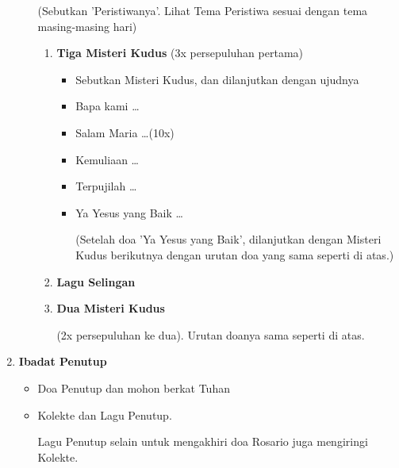 \begin{enumerate}[label=\Roman*.]
\begin{itemize}
(Sebutkan 'Peristiwanya'. Lihat Tema Peristiwa sesuai dengan tema masing-masing hari)

\begin{enumerate}[label=\alph*.]
\item  \textbf{Tiga Misteri Kudus }
(3x persepuluhan pertama)
\begin{itemize}
\item Sebutkan Misteri Kudus, dan dilanjutkan dengan ujudnya
\item Bapa kami \ldots
\item Salam Maria  \ldots(10x)
\item Kemuliaan  \ldots
\item Terpujilah  \ldots
\item Ya Yesus yang Baik  \ldots

(Setelah doa 'Ya Yesus yang Baik', dilanjutkan dengan Misteri Kudus berikutnya dengan urutan doa yang sama seperti di atas.)

\end{itemize}

\item \textbf{Lagu Selingan} 

\item  \textbf{Dua Misteri Kudus} 

(2x persepuluhan ke dua). Urutan doanya sama seperti di atas.


\end{enumerate}
\end{itemize}


\item  \textbf{Ibadat Penutup}
\begin{itemize}
\item Doa Penutup dan mohon berkat Tuhan
\item Kolekte dan Lagu Penutup. 

Lagu Penutup selain untuk mengakhiri doa Rosario juga mengiringi Kolekte.
\end{itemize}
\end{enumerate}
